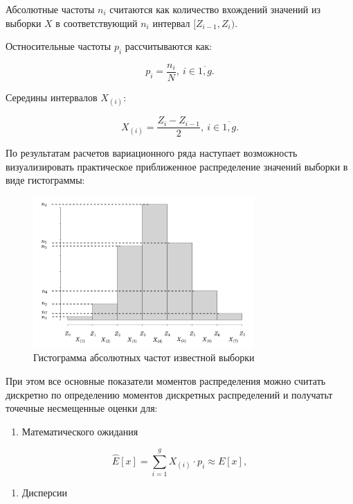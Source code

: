 \documentclass[
  14,
]{article}
\providecommand{\tightlist}{%
  \setlength{\itemsep}{0pt}\setlength{\parskip}{0pt}}
\begin{document}
Абсолютные частоты \(n_i\) считаются как количество вхождений значений
из выборки \(X\) в соответствующий \(n_i\) интервал
\([Z_{i-1}, Z_{i})\).

Остносительные частоты \(p_i\) рассчитываются как:

\[
p_i = \frac{n_i}{N}, \ i \in \overline{1, g}.
\]

Середины интервалов \(X_{(i)}\):

\[
X_{(i)} = \frac{Z_{i} - Z_{i - 1}}{2}, \ i \in \overline{1,g}.
\]

По результатам расчетов вариационного ряда наступает возможность
визуализировать практическое приближенное распределение значений выборки
в виде гистограммы:

\begin{figure}
\centering
\includegraphics[width=0.75\textwidth,height=\textheight]{Statistics-Гистограмма.drawio.png}
\caption{Гистограмма абсолютных частот известной выборки}
\end{figure}

При этом все основные показатели моментов распределения можно считать
дискретно по определению моментов дискретных распределений и получатьт
точечные несмещенные оценки для:

\begin{enumerate}
\def\labelenumi{\arabic{enumi}.}
\tightlist
\item
  Математического ожидания
\end{enumerate}

\[
\hat{E}[x] = \sum_{i=1}^{g} X_{(i)} \cdot p_{i} \approx E[x],
\]

\begin{enumerate}
\def\labelenumi{\arabic{enumi}.}
\setcounter{enumi}{1}
\tightlist
\item
  Дисперсии
\end{enumerate}
\end{document}
